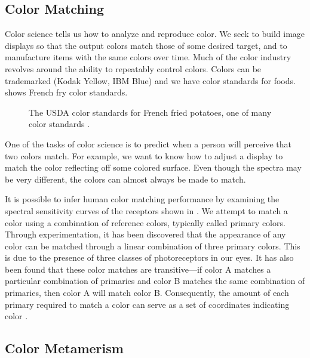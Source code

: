 

\subsection{Color Matching}

Color science tells us how to analyze and reproduce color.
We seek to build image displays so that the output colors match those of
some desired target, and to manufacture items with the same colors over
time.  Much of the color industry revolves around the ability to repeatably control colors.
Colors can be trademarked (Kodak Yellow, IBM Blue) and we have
color standards for foods.  \Fig{\ref{fig:french}} shows French fry color
standards.

\begin{figure}[t]
\centerline{
}
\caption{The USDA color standards for French fried potatoes, one of
  many color standards \cite{Munsell2020}.} 
\label{fig:french}
\end{figure}

One of the tasks of color science is to predict when a person will
perceive that two colors match.  For example, we
want to know how to adjust a display to match the color
reflecting off some colored surface.  Even though the spectra may be
very different, the colors can almost always be made to match.

It is possible to infer human color matching performance by examining the spectral sensitivity curves of the receptors shown in . We attempt to match a color using a combination of reference colors, typically called primary colors. Through experimentation, it has been discovered that the appearance of any color can be matched through a linear combination of three primary colors. This is due to the presence of three classes of photoreceptors in our eyes. It has also been found that these color matches are transitive—if color A matches a particular combination of primaries and color B matches the same combination of primaries, then color A will match color B. Consequently, the amount of each primary required to match a color can serve as a set of coordinates indicating color \cite{Wandell95}.

\subsection{Color Metamerism}


